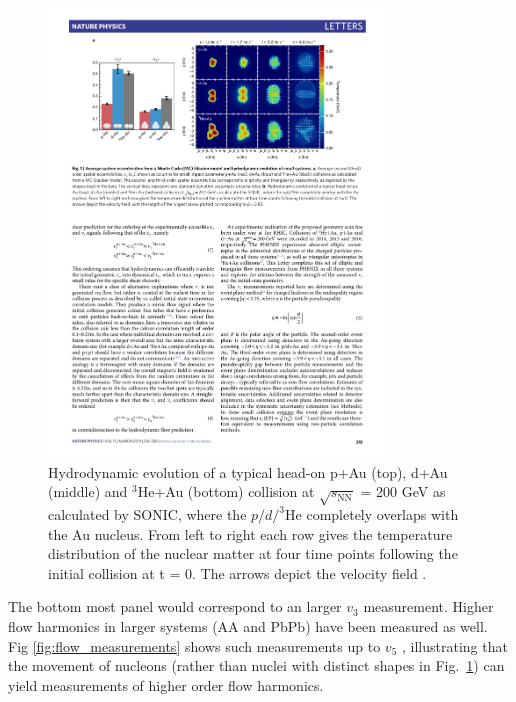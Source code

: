   \begin{figure}[htpb]
    \centering
    \includegraphics[width=0.8\textwidth]{Introduction/collision_geometries.pdf}
    \caption{Hydrodynamic evolution of a typical head-on p+Au (top), d+Au (middle) and $^3$He+Au (bottom) collision at $\sqrt{s_\mathrm{NN}}$ = 200 GeV as calculated by SONIC, where the $p/d/^3$He completely overlaps with the Au nucleus. From left to right each row gives the temperature distribution of the nuclear matter at four time points following the initial collision at t = 0. The arrows depict the velocity field \cite{Aidala2019}.}
    \label{fig:collision_geometries}
  \end{figure}

  The bottom most panel would correspond to an larger $v_3$ measurement. Higher flow harmonics in larger systems (AA and PbPb) have been measured as well. Fig \ref{fig:flow_measurements} shows such measurements up to $v_5$ \cite{Aamodt2011}, illustrating that the movement of nucleons (rather than nuclei with distinct shapes in Fig.~\ref{fig:collision_geometries}) can yield measurements of higher order flow harmonics. 

